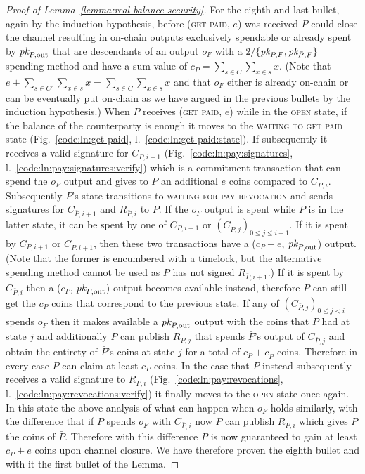 \begin{proof}[Proof of Lemma~\ref{lemma:real-balance-security}]
  For the eighth and last bullet, again by the induction hypothesis, before
  (\textsc{get paid}, $e$) was received $P$ could close the channel resulting in
  on-chain outputs exclusively spendable or already spent by $\textit{pk}_{P,
  \mathrm{out}}$ that are descendants of an output $o_F$ with a $2/\{\textit{pk}_{P, F},
  \textit{pk}_{\bar{P}, F}\}$ spending method and have a sum value of $c_P =
  \sum\limits_{s \in C} \sum\limits_{x \in s} x$. (Note that $e + \sum\limits_{s
  \in C'} \sum\limits_{x \in s} x = \sum\limits_{s \in C} \sum\limits_{x \in s}
  x$ and that $o_F$ either is already on-chain or can be eventually put on-chain
  as we have argued in the previous bullets by the induction hypothesis.) When
  $P$ receives (\textsc{get paid}, $e$) while in the \textsc{open} state, if the
  balance of the counterparty is enough it moves to the \textsc{waiting to get
  paid} state (Fig.~\ref{code:ln:get-paid}, l.~\ref{code:ln:get-paid:state}). If
  subsequently it receives a valid signature for $C_{P, i+1}$
  (Fig.~\ref{code:ln:pay:signatures}, l.~\ref{code:ln:pay:signatures:verify})
  which is a commitment transaction that can spend the $o_F$ output and gives to
  $P$ an additional $e$ coins compared to $C_{P, i}$. Subsequently $P$'s state
  transitions to \textsc{waiting for pay revocation} and sends signatures for
  $C_{\bar{P}, i+1}$ and $R_{\bar{P}, i}$ to $\bar{P}$. If the $o_F$ output is
  spent while $P$ is in the latter state, it can be spent by one of $C_{P, i+1}$
  or $(C_{\bar{P}, j})_{0 \leq j \leq i+1}$. If it is spent by $C_{P, i+1}$ or
  $C_{\bar{P}, i+1}$, then these two transactions have a ($c_P + e$, $\textit{pk}_{P,
  \mathrm{out}}$) output. (Note that the former is encumbered with a timelock,
  but the alternative spending method cannot be used as $P$ has not signed
  $R_{\bar{P}, i+1}$.) If it is spent by $C_{\bar{P}, i}$ then a ($c_P$, $\textit{pk}_{P,
  \mathrm{out}}$) output becomes available instead, therefore $P$ can still get
  the $c_P$ coins that correspond to the previous state. If any of $(C_{\bar{P},
  j})_{0 \leq j < i}$ spends $o_F$ then it makes available a $\textit{pk}_{P,
  \mathrm{out}}$ output with the coins that $P$ had at state $j$ and
  additionally $P$ can publish $R_{P, j}$ that spends $\bar{P}$'s output of
  $C_{\bar{P}, j}$ and obtain the entirety of $\bar{P}$'s coins at state $j$ for
  a total of $c_P + c_{\bar{P}}$ coins.  Therefore in every case $P$ can claim
  at least $c_P$ coins. In the case that $P$ instead subsequently receives a
  valid signature to $R_{P, i}$ (Fig.~\ref{code:ln:pay:revocations},
  l.~\ref{code:ln:pay:revocations:verify}) it finally moves to the \textsc{open}
  state once again. In this state the above analysis of what can happen when
  $o_F$ holds similarly, with the difference that if $\bar{P}$ spends $o_F$ with
  $C_{\bar{P}, i}$ now $P$ can publish $R_{P, i}$ which gives $P$ the coins of
  $\bar{P}$. Therefore with this difference $P$ is now guaranteed to gain at
  least $c_P + e$ coins upon channel closure. We have therefore proven the
  eighth bullet and with it the first bullet of the Lemma.


\end{proof}
